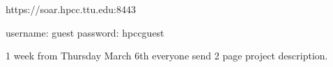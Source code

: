 https://soar.hpcc.ttu.edu:8443

username: guest
password: hpccguest

1 week from Thursday March 6th everyone send 2 page project description.   